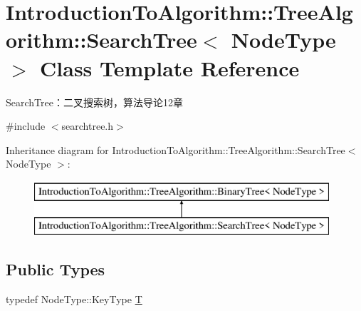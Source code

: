 \hypertarget{class_introduction_to_algorithm_1_1_tree_algorithm_1_1_search_tree}{}\section{Introduction\+To\+Algorithm\+:\+:Tree\+Algorithm\+:\+:Search\+Tree$<$ Node\+Type $>$ Class Template Reference}
\label{class_introduction_to_algorithm_1_1_tree_algorithm_1_1_search_tree}


Search\+Tree：二叉搜索树，算法导论12章  




{\ttfamily \#include $<$searchtree.\+h$>$}

Inheritance diagram for Introduction\+To\+Algorithm\+:\+:Tree\+Algorithm\+:\+:Search\+Tree$<$ Node\+Type $>$\+:\begin{figure}[H]
\begin{center}
\leavevmode
\includegraphics[height=2.000000cm]{class_introduction_to_algorithm_1_1_tree_algorithm_1_1_search_tree}
\end{center}
\end{figure}
\subsection*{Public Types}
\begin{DoxyCompactItemize}
\item 
typedef Node\+Type\+::\+Key\+Type \hyperlink{class_introduction_to_algorithm_1_1_tree_algorithm_1_1_search_tree_a0a9b2de6326042f2a1fa8a3a0def67ab}{T}
\end{DoxyCompactItemize}
